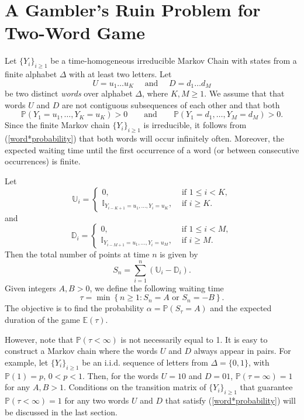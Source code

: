 \documentclass{amsart}
\newcommand{\PP}{{\mathbb{P}}}
\newcommand{\EE}{{\mathbb{E}}}
\newcommand{\U}{{\mathbb{U}}}
\newcommand{\D}{{\mathbb{D}}}
\newcommand{\I}{{\mathbb{I}}}
\newcommand{\1}{{\mathbf{1}}}
\begin{document}
\section{A Gambler's Ruin Problem for Two-Word Game}

Let $\{Y_i\}_{i\geq 1}$ be a time-homogeneous irreducible Markov Chain with states
from a finite alphabet $\Delta$ with at least two letters. Let $$U=u_1\dots u_K \quad\mbox{ and }\quad
D=d_1\dots d_M$$ be two distinct {\it words} over alphabet $\Delta$, where $K,M\geq 1$. %
We assume that that words $U$ and $D$ are not contiguous subsequences of each other and that both
\begin{equation}\label{word*probability}
\PP(Y_1=u_1,\dots,Y_K=u_K)>0\quad\quad
\mbox{and}\quad\quad
\PP(Y_1=d_1,\dots,Y_M=d_M)>0.
\end{equation}
{Since the finite Markov chain $\{Y_i\}_{i\geq 1}$ is irreducible, it follows from (\ref{word*probability})
that both words will occur infinitely often. Moreover, the expected waiting time until the first
occurrence of a word (or between consecutive occurrences) is finite.}

Let
$$
\U_i=\left\{\begin{array}{ll}
             0,& \mbox{ if } 1\leq i<K, \\
             \I_{Y_{i-K+1}=u_1,\dots,Y_i=u_K},& \mbox{ if } i\geq K.
           \end{array}
\right.
$$
and
$$
\D_i=\left\{\begin{array}{ll}
             0,& \mbox{ if } 1\leq i<M, \\
             \I_{Y_{i-M+1}=u_1,\dots,Y_i=u_M},& \mbox{ if } i\geq M.
           \end{array}
\right.
$$
Then the total number of points at time $n$ is given by  $$ S_n=\sum_{i=1}^n (\U_i-\D_i).$$
Given integers $A,B>0$, we define the following waiting time
\begin{equation*}\label{stopping*time}
\tau=\min\left\{ n\geq 1: S_n=A \mbox{ or } S_n=-B\right\}.
\end{equation*}
The objective is to find the probability $\alpha=\PP(S_\tau=A)$ and the
expected duration of the game $\EE(\tau)$.

However, note that $\PP(\tau < \infty)$ is not necessarily equal to 1. It is easy
to construct a Markov chain where the words $U$ and $D$ always appear in pairs.
For example, let $\{Y_i\}_{i\geq 1}$ be an i.i.d. sequence of letters from
$\Delta = \{0, 1\}$, with $\PP(1) = p$, $0 < p < 1$. Then, for the words $U = 10$ and $D = 01$,
$\PP(\tau = \infty)=1$ for any $A, B > 1$. Conditions on the transition matrix
of $\{Y_i\}_{i\geq 1}$ that guarantee $\PP(\tau < \infty) = 1$ for any two words $U$
and $D$ that satisfy (\ref{word*probability}) will be discussed in the last section.
\end{document}
